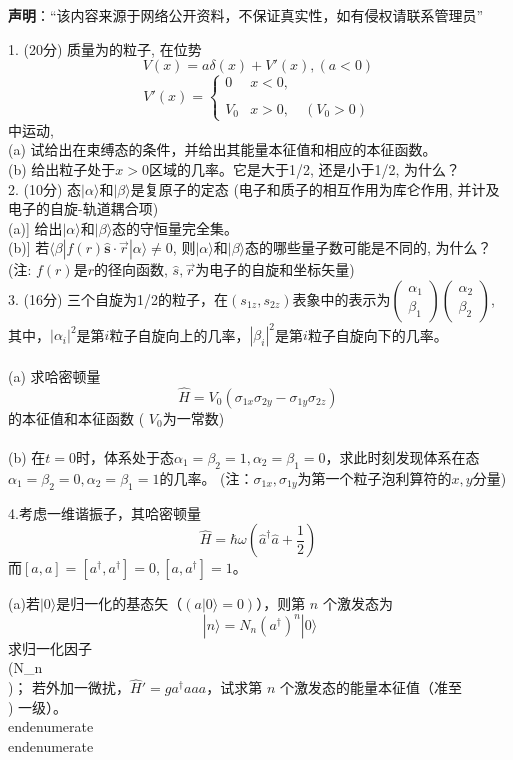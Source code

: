 
\textbf{声明}：“该内容来源于网络公开资料，不保证真实性，如有侵权请联系管理员”

1. (20分) 质量为的粒子, 在位势
$$V(x) = a \delta (x) + V'(x), (a < 0)~$$
$$V'(x) = \begin{cases} 0 & x < 0, \\\\ V_0 & x > 0,\quad (V_0 > 0)\end{cases}~$$
中运动,\\
(a) 试给出在束缚态的条件，并给出其能量本征值和相应的本征函数。\\
(b) 给出粒子处于$ x > 0 $区域的几率。它是大于1/2, 还是小于1/2, 为什么？\\

2. (10分) 态$|\alpha\rangle$和$|\beta\rangle$是复原子的定态 (电子和质子的相互作用为库仑作用, 并计及电子的自旋-轨道耦合项)\\
(a)] 给出$|\alpha\rangle$和$|\beta\rangle$态的守恒量完全集。\\
(b)] 若$\langle \beta | f({r}) \hat{\mathbf{s}} \cdot \vec{r} | \alpha \rangle \neq 0$, 则$|\alpha\rangle$和$|\beta\rangle$态的哪些量子数可能是不同的, 为什么？\\
(注: $f({r})$是$r$的径向函数, $\hat{s},\vec{r}$为电子的自旋和坐标矢量)\\

3. (16分) 三个自旋为1/2的粒子，在$(s_{1z}, s_{2z})$表象中的表示为$\begin{pmatrix} \alpha_1 \\ \beta_1 \end{pmatrix} \begin{pmatrix} \alpha_2 \\ \beta_2 \end{pmatrix}$, 其中，$\left|\alpha_i\right|^2$是第$i$粒子自旋向上的几率，$\left|\beta_i\right|^2$是第$i$粒子自旋向下的几率。\\\\
(a) 求哈密顿量 
$$\hat{H} = V_0 (\sigma_{1x} \sigma_{2y} - \sigma_{1y} \sigma_{2z})~$$
    的本征值和本征函数 ( $V_0$为一常数)\\\\
(b) 在$t=0$时，体系处于态$\alpha_1 = \beta_2 = 1, \alpha_2 = \beta_1 = 0$，求此时刻发现体系在态$\alpha_1 = \beta_2 = 0, \alpha_2 = \beta_1 = 1$的几率。
    (注：$\sigma_{1x}, \sigma_{1y}$为第一个粒子泡利算符的$x,y$分量)

4.考虑一维谐振子，其哈密顿量
$$\hat{H} = \hbar \omega \left( \hat{a}^\dagger \hat{a} + \frac{1}{2} \right)~$$
    而$[a, a] = [a^\dagger, a^\dagger] = 0, [a, a^\dagger] = 1$。

(a)若$|0\rangle$是归一化的基态矢（$(a|0\rangle = 0)$），则第 $n$ 个激发态为
        \[        |n\rangle = N_n (a^\dagger)^n |0\rangle        \]
        求归一化因子 \\(N_n\\)；
若外加一微扰，$\hat{H}' = g a^\dagger a a a$，试求第 $n$ 个激发态的能量本征值（准至 \g\\) 一级）。
    \\end{enumerate}
\\end{enumerate}
